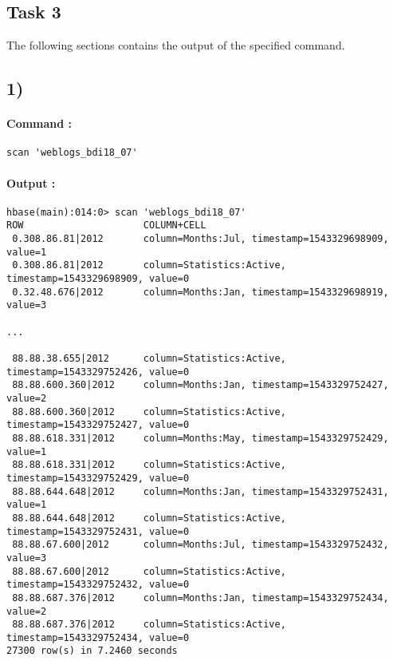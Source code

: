 \documentclass[a4paper,11pt]{report}
\begin{document}
\begin{landscape}
  
\section*{Task 3}

The following sections contains the output of the specified command.

\subsection*{1)}

\paragraph{Command : } \verb+scan 'weblogs_bdi18_07'+

\paragraph{Output : }

\begin{verbatim}
hbase(main):014:0> scan 'weblogs_bdi18_07'
ROW                     COLUMN+CELL                                                                                                            
 0.308.86.81|2012       column=Months:Jul, timestamp=1543329698909, value=1                                                                    
 0.308.86.81|2012       column=Statistics:Active, timestamp=1543329698909, value=0                                                             
 0.32.48.676|2012       column=Months:Jan, timestamp=1543329698919, value=3                

...

 88.88.38.655|2012      column=Statistics:Active, timestamp=1543329752426, value=0                                    
 88.88.600.360|2012     column=Months:Jan, timestamp=1543329752427, value=2                                           
 88.88.600.360|2012     column=Statistics:Active, timestamp=1543329752427, value=0                                    
 88.88.618.331|2012     column=Months:May, timestamp=1543329752429, value=1                                           
 88.88.618.331|2012     column=Statistics:Active, timestamp=1543329752429, value=0                                    
 88.88.644.648|2012     column=Months:Jan, timestamp=1543329752431, value=1                                           
 88.88.644.648|2012     column=Statistics:Active, timestamp=1543329752431, value=0                                    
 88.88.67.600|2012      column=Months:Jul, timestamp=1543329752432, value=3                                           
 88.88.67.600|2012      column=Statistics:Active, timestamp=1543329752432, value=0                                    
 88.88.687.376|2012     column=Months:Jan, timestamp=1543329752434, value=2                                           
 88.88.687.376|2012     column=Statistics:Active, timestamp=1543329752434, value=0                                    
27300 row(s) in 7.2460 seconds
\end{verbatim}
\end{landscape}
\end{document}
